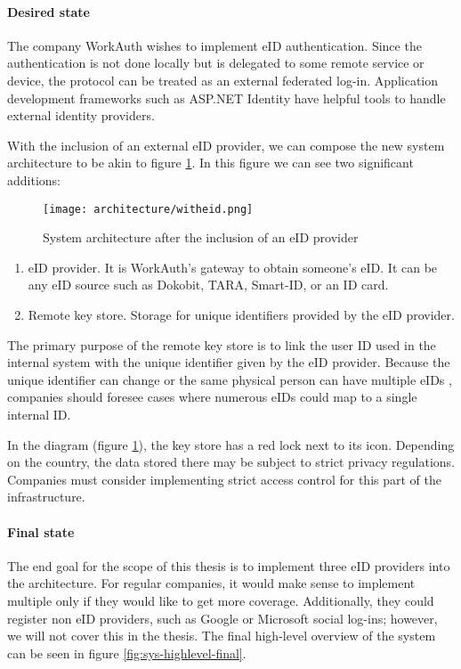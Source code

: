 \paragraph{Desired state}

The company WorkAuth wishes to implement eID authentication. Since the authentication is not done locally but is delegated to some remote service or device, the protocol can be treated as an external federated log-in. Application development frameworks such as ASP.NET Identity have helpful tools to handle external identity providers.

With the inclusion of an external eID provider, we can compose the new system architecture to be akin to figure \ref{fig:sys-highlevel-witheid}. In this figure we can see two significant additions:

\begin{figure}
  \centering
  \texttt{[image: architecture/witheid.png]}
  \caption{System architecture after the inclusion of an eID provider}
  \label{fig:sys-highlevel-witheid}
\end{figure}

\begin{enumerate}
  \item {eID provider}. It is WorkAuth's gateway to obtain someone's eID. It can be any eID source such as Dokobit, TARA, Smart-ID, or an ID card.
  \item {Remote key store}. Storage for unique identifiers provided by the eID provider.
\end{enumerate}

The primary purpose of the remote key store is to link the user ID used in the internal system with the unique identifier given by the eID provider. Because the unique identifier can change or the same physical person can have multiple eIDs \cite{eidas-saml}, companies should foresee cases where numerous eIDs could map to a single internal ID.

In the diagram (figure \ref{fig:sys-highlevel-witheid}), the key store has a red lock next to its icon. Depending on the country, the data stored there may be subject to strict privacy regulations. Companies must consider implementing strict access control for this part of the infrastructure.

\paragraph{Final state}

The end goal for the scope of this thesis is to implement three eID providers into the architecture. For regular companies, it would make sense to implement multiple only if they would like to get more coverage. Additionally, they could register non eID providers, such as Google or Microsoft social log-ins; however, we will not cover this in the thesis. The final high-level overview of the system can be seen in figure \ref{fig:sys-highlevel-final}.


